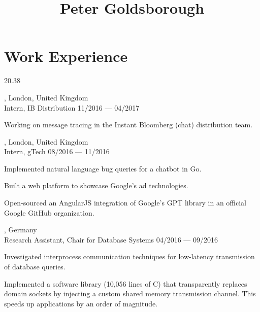 




\begin{header}
	\title{Peter Goldsborough}
	\separate
	\separate
\end{header}

\section{Work Experience}{2}{0.38}

\begin{entry}
	{, London, United Kingdom}
	{\\Intern, IB Distribution}
	{11/2016 --- 04/2017}
  \vspace{-1mm}
	\item Working on message tracing in the Instant Bloomberg (chat) distribution team.
\end{entry}

\begin{entry}
	{, London, United Kingdom}
	{\\Intern, gTech}
	{08/2016 --- 11/2016}
  \item Implemented natural language bug queries for a chatbot in Go.
  \item Built a web platform to showcase Google's ad technologies.
  \item Open-sourced an AngularJS integration of Google’s GPT library in an official Google GitHub organization.
\end{entry}

\begin{entry}
	{, Germany}
	{\\Research Assistant, Chair for Database Systems}
	{04/2016 --- 09/2016}

  \item Investigated interprocess communication techniques for low-latency transmission of database queries.
  \item Implemented a software library (10,056 lines of C) that transparently replaces domain sockets by injecting a custom shared memory transmission channel. This speeds up applications by an order of magnitude.
\end{entry}

